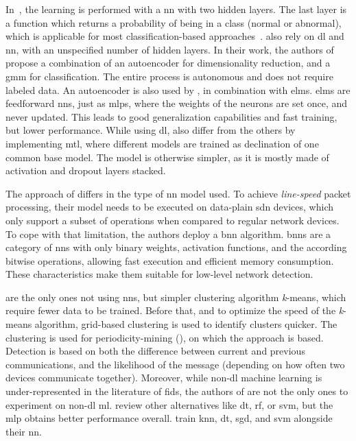 In~\cite{zhang_BlockchainbasedFederatedLearning_2020}, the learning is performed with a \gls{nn} with two hidden layers.
The last layer is a  function which returns a probability of being in a class (normal or abnormal), which is applicable for most classification-based approaches~\cite{fan_IoTDefenderFederatedTransfer_2020,li_DeepFedFederatedDeep_2020,Popoola2021,rahman_InternetThingsIntrusion_2020,Sun2020,Sun2021,al-athbaal-marri_FederatedMimicLearning_2020}.
\textcite{rathore_BlockSecIoTNetBlockchainbaseddecentralized_2019} also rely on \gls{dl} and \gls{nn}, with an unspecified number of hidden layers.
In their work, the authors of \cite{chen_Networkanomalydetection_2020} propose a combination of an autoencoder for dimensionality reduction, and a \gls{gmm} for classification.
The entire process is autonomous and does not require labeled data.
An autoencoder is also used by \cite{qin_FederatedLearningBasedNetwork_2021}, in combination with \glspl{elm}.
\Glspl{elm} are feedforward \glspl{nn}, just as \glspl{mlp}, where the weights of the neurons are set once, and never updated.
This leads to good generalization capabilities and fast training, but lower performance.
While using \gls{dl}, \textcite{zhao_MultiTaskNetworkAnomaly_2019} also differ from the others by implementing \gls{mtl}, where different models are trained as declination of one common base model.
The model is otherwise simpler, as it is mostly made of activation and dropout layers stacked.

The approach of \textcite{qin_LineSpeedScalableIntrusion_2020a} differs in the type of \gls{nn} model used.
To achieve \emph{line-speed} packet processing, their model needs to be executed on data-plain \gls{sdn} devices, which only support a subset of operations when compared to regular network devices.
To cope with that limitation, the authors deploy a \gls{bnn} algorithm.
\Glspl{bnn} are a category of \glspl{nn} with only binary weights, activation functions, and the according bitwise operations, allowing fast execution and efficient memory consumption.
These characteristics make them suitable for low-level network detection.

\textcite{pahl_AllEyesYou_2018} are the only ones not using \glspl{nn}, but simpler clustering algorithm \emph{k}-means, which require fewer data to be trained.
Before that, and to optimize the speed of the \emph{k}-means algorithm, grid-based clustering is used to identify clusters quicker.
The clustering is used for periodicity-mining (), on which the approach is based.
Detection is based on both the difference between current and previous communications, and the likelihood of the message (depending on how often two devices communicate together).
Moreover, while non-\gls{dl} machine learning is under-represented in the literature of \gls{fids}, the authors of \cite{pahl_AllEyesYou_2018} are not the only ones to experiment on non-\gls{dl} \gls{ml}.
\textcite{hei_trustedfeatureaggregator_2020} review other alternatives like \gls{dt}, \gls{rf}, or \gls{svm}, but the \gls{mlp} obtains better performance overall.
\textcite{schneble_Attackdetectionusing_2019} train \gls{knn}, \gls{dt}, \gls{sgd}, and \gls{svm} alongside their \acrlong{nn}.

